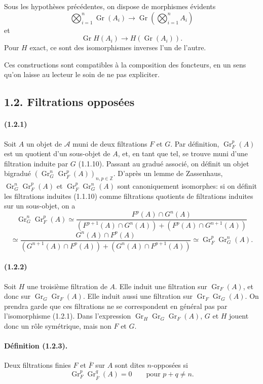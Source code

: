 \documentclass[10pt]{article}
\newcommand{\Z}{\mathbb Z}
\newcommand{\Gr}{\operatorname{Gr}}
\newcommand{\calA}{\mathcal A}
\begin{document}
Sous les hypothèses précédentes, on dispose de morphismes évidents
\[
\bigotimes_{i=1}^n\Gr(A_i)\to \Gr\left(\bigotimes_{i=1}^nA_i\right)
\]
et
\[
\Gr H(A_i)\to H(\Gr(A_i)).
\]
Pour $H$ exact, ce sont des isomorphismes inverses l'un de l'autre.

Ces constructions sont compatibles à la composition des foncteurs, en un sens qu'on laisse au lecteur le soin de ne pas expliciter.

\subsection*{1.2. Filtrations opposées}

\paragraph{(1.2.1)} Soit $A$ un objet de $\calA$ muni de deux filtrations $F$ et $G$. Par définition, $\Gr_F^p(A)$ est un quotient d'un sous-objet de $A$, et, en tant que tel, se trouve muni d'une filtration induite par $G$ (1.1.10). Passant au gradué associé, on définit un objet bigradué $(\Gr_G^n\Gr_F^p(A))_{n,p\in\Z}$. D'après un lemme de Zassenhaus, $\Gr_G^n\Gr_F^p(A)$ et $\Gr_F^p\Gr_G^n(A)$ sont canoniquement isomorphes: si on définit les filtrations induites (1.1.10) comme filtrations quotients de filtrations induites sur un sous-objet, on a
\[
\Gr_G^n\Gr_F^p(A)\simeq
\frac{F^p(A)\cap G^n(A)}{(F^{p+1}(A)\cap G^n(A))+(F^p(A)\cap G^{n+1}(A))}
\]
\[
\simeq
\frac{G^n(A)\cap F^p(A)}{(G^{n+1}(A)\cap F^p(A))+(G^n(A)\cap F^{p+1}(A))}
\simeq \Gr_F^p\Gr_G^n(A).
\]

\paragraph{(1.2.2)} Soit $H$ une troisième filtration de $A$. Elle induit une filtration sur $\Gr_F(A)$, et donc sur $\Gr_G\Gr_F(A)$. Elle induit aussi une filtration sur $\Gr_F\Gr_G(A)$. On prendra garde que ces filtrations ne se correspondent en général pas par l'isomorphisme (1.2.1). Dans l'expression $\Gr_H\Gr_G\Gr_F(A)$, $G$ et $H$ jouent donc un rôle symétrique, mais non $F$ et $G$.

\paragraph{Définition (1.2.3).} Deux filtrations finies $F$ et $\overline F$ sur $A$ sont dites $n$-opposées si
\[
\Gr_F^p\Gr_{\overline F}^{q}(A)=0\qquad\text{pour }p+q\ne n.
\]
\end{document}
